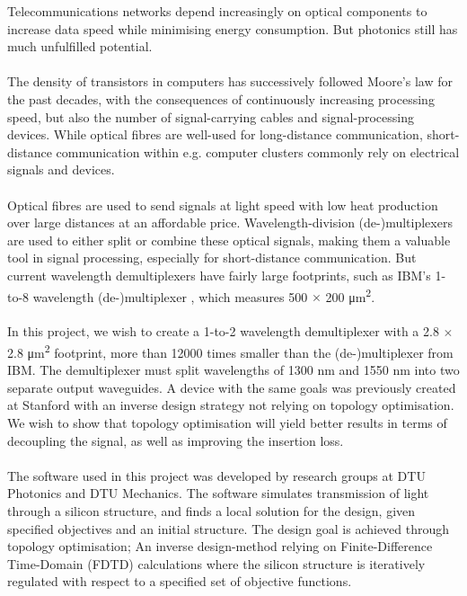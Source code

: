 Telecommunications networks depend increasingly on optical components to increase data speed while minimising energy consumption. But photonics still has much unfulfilled potential. \\
\\
The density of transistors in computers has successively followed Moore's law for the past decades, with the consequences of continuously increasing processing speed, but also the number of signal-carrying cables and signal-processing devices. While optical fibres are well-used for long-distance communication, short-distance communication within e.g. computer clusters commonly rely on electrical signals and devices.\\
\\
Optical fibres are used to send signals at light speed with low heat production over large distances at an affordable price. Wavelength-division (de-)multiplexers are used to either split or combine these optical signals, making them a valuable tool in signal processing, especially for short-distance communication. But current wavelength demultiplexers have fairly large footprints, such as IBM's 1-to-8 wavelength (de-)multiplexer \cite{IBMdemultiplexer}, which measures 500 $\times$ 200 \si{\micro m^2}. \\
\\
In this project, we wish to create a 1-to-2 wavelength demultiplexer with a 2.8 $\times$ 2.8 \si{\micro m^2} footprint, more than 12000 times smaller than the (de-)multiplexer from IBM. The demultiplexer must split wavelengths of 1300 nm and 1550 nm into two separate output waveguides. A device with the same goals was previously created at Stanford\cite{Stanford} with an inverse design strategy not relying on topology optimisation. We wish to show that topology optimisation will yield better results in terms of decoupling the signal, as well as improving the insertion loss.\\
\\
The software used in this project was developed by research groups at DTU Photonics and DTU Mechanics. The software simulates transmission of light through a silicon structure, and finds a local solution for the design, given specified objectives and an initial structure. The design goal is achieved through topology optimisation; An inverse design-method relying on Finite-Difference Time-Domain (FDTD) calculations where the silicon structure is iteratively regulated with respect to a specified set of objective functions.

